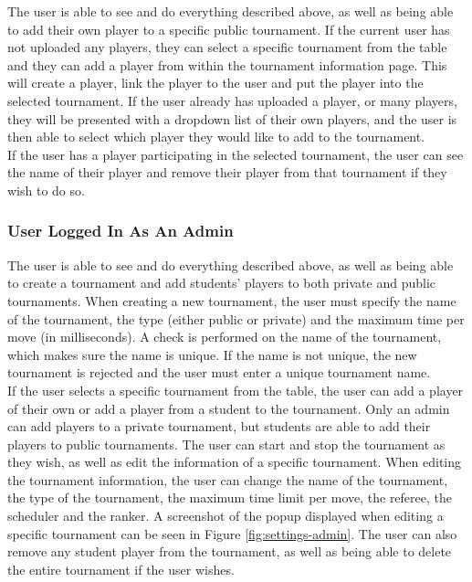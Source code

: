 \documentclass[a4paper, 11pt]{report}
\begin{document}
The user is able to see and do everything described above, as well as being able
to add their own player to a specific public tournament. If the current user has not
uploaded any players, they can select a specific tournament from the table and
they can add a player from within the tournament information page. This will create
a player, link the player to the user and put the player into the selected
tournament. If the user already has uploaded a player, or many players, they will
be presented with a dropdown list of their own players, and the user is then able
to select which player they would like to add to the tournament. \\

If the user has a player participating in the selected tournament, the user can
see the name of their player and remove their player from that tournament if
they wish to do so.

\subsubsection*{User Logged In As An Admin}

The user is able to see and do everything described above, as well as being able
to create a tournament and add students' players to both private and public
tournaments. When creating a new tournament, the user must specify the name of
the tournament, the type (either public or private) and the maximum time per move
(in milliseconds). A check is performed on the name of the tournament, which makes
sure the name is unique. If the name is not unique, the new tournament is rejected
and the user must enter a unique tournament name. \\

If the user selects a specific tournament from the table, the user can add a player
of their own or add a player from a student to the tournament. Only an admin can
add players to a private tournament, but students are able to add their players
to public tournaments. The user can start and stop the tournament as they wish,
as well as edit the information of a specific tournament. When editing the
tournament information, the user can change the name of the tournament, the type
of the tournament, the maximum time limit per move, the referee, the scheduler
and the ranker. A screenshot of the popup displayed when editing a specific
tournament can be seen in Figure \ref{fig:settings-admin}. The user can also
remove any student player from the tournament, as well as being able to delete
the entire tournament if the user wishes.
\end{document}
